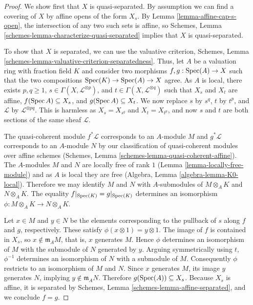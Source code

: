 \begin{proof}
We show first that $X$ is quasi-separated.  By assumption we
can find a covering of $X$ by affine opens of the form
$X_s$.  By Lemma \ref{lemma-affine-cap-s-open}, the
intersection of any two such sets is affine, so Schemes, Lemma
\ref{schemes-lemma-characterize-quasi-separated} implies
that $X$ is quasi-separated.

\medskip\noindent
To show that $X$ is separated, we can use the valuative
criterion, Schemes, Lemma
\ref{schemes-lemma-valuative-criterion-separatedness}.
Thus, let $A$ be a valuation ring with fraction field $K$
and consider two morphisms $f, g : \mathop{\mathrm{Spec}}(A) \to X$ such that
the two compositions $\mathop{\mathrm{Spec}}(K) \to \mathop{\mathrm{Spec}}(A) \to X$ agree.
As $A$ is local, there exists $p, q \ge 1$, $s \in \Gamma(X,
\mathcal{L}^{\otimes p})$, and $t \in \Gamma(X,
\mathcal{L}^{\otimes q})$ such that $X_s$ and $X_t$ are
affine, $f(\mathop{\mathrm{Spec}} A) \subseteq X_s$, and $g(\mathop{\mathrm{Spec}} A)
\subseteq X_t$.  We now replace $s$ by $s^q$, $t$ by $t^p$,
and $\mathcal{L}$ by $\mathcal{L}^{\otimes pq}$.  This is
harmless as $X_s = X_{s^q}$ and $X_t = X_{t^p}$, and now $s$
and $t$ are both sections of the same sheaf $\mathcal{L}$.

\medskip\noindent
The quasi-coherent module $f^*\mathcal{L}$ corresponds to an $A$-module $M$ and
$g^*\mathcal{L}$ corresponds to an $A$-module $N$ by our
classification of quasi-coherent modules over affine schemes
(Schemes, Lemma \ref{schemes-lemma-quasi-coherent-affine}).
The $A$-modules $M$ and $N$ are locally free of rank
$1$ (Lemma \ref{lemma-locally-free-module}) and as $A$ is
local they are free (Algebra, Lemma
\ref{algebra-lemma-K0-local}).  Therefore we may identify
$M$ and $N$ with $A$-submodules of $M \otimes_A K$ and $N
\otimes_A K$.  The equality $f|_{\mathop{\mathrm{Spec}}(K)} = g|_{\mathop{\mathrm{Spec}}(K)}$
determines an isomorphism $\phi \colon M \otimes_A K \to N
\otimes_A K$.

\medskip\noindent
Let $x \in M$ and $y \in N$ be the elements corresponding to
the pullback of $s$ along $f$ and $g$, respectively.  These
satisfy $\phi(x \otimes 1) = y \otimes 1$.  The image of $f$
is contained in $X_s$, so $x \not\in \mathfrak{m}_A M$, that
is, $x$ generates $M$.  Hence $\phi$ determines an
isomorphism of $M$ with the submodule of $N$ generated by
$y$.  Arguing symmetrically using $t$, $\phi^{-1}$
determines an isomorphism of $N$ with a submodule of $M$.
Consequently $\phi$ restricts to an isomorphism of $M$ and
$N$.  Since $x$ generates $M$, its image $y$ generates
$N$, implying $y \not\in \mathfrak{m}_A N$.  Therefore
$g(\mathop{\mathrm{Spec}}(A)) \subseteq X_s$.  Because $X_s$ is affine, it is
separated by Schemes, Lemma \ref{schemes-lemma-affine-separated},
and we conclude $f = g$.
\end{proof}

